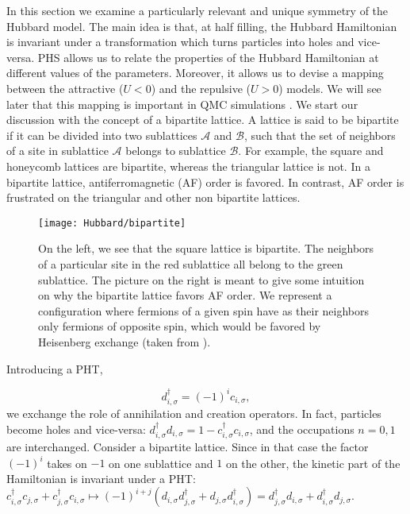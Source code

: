 In this section we examine a particularly relevant and unique symmetry of the Hubbard model.
The main idea is that, at half filling, the Hubbard Hamiltonian is invariant under a transformation which turns particles into holes and vice-versa.
\ac{PHS} allows us to relate the properties of the Hubbard Hamiltonian at different values of the parameters.
Moreover, it allows us to devise a mapping between the attractive ($U < 0$) and the repulsive ($U > 0$) models.
We will see later that this mapping is important in QMC simulations \cite{alavi_quantum_2016}.
We start our discussion with the concept of a bipartite lattice.
A lattice is said to be bipartite if it can be divided into two sublattices $\mathcal{A}$ and $\mathcal{B}$, such that the set of neighbors of a site in sublattice $\mathcal{A}$ belongs to sublattice $\mathcal{B}$.
For example, the square and honeycomb lattices are bipartite, whereas the triangular lattice is not.
In a bipartite lattice, antiferromagnetic (\acs{AF}) order is favored.
In contrast, \acs{AF} order is frustrated on the triangular and other non bipartite lattices.
\vspace{-0.2cm}
\begin{figure}[H]\label{fig:bipartite}
\centering
\texttt{[image: Hubbard/bipartite]}
\caption[Bipartite lattices and antiferromagnetic order.]{On the left, we see that the square lattice is bipartite.
The neighbors of a particular site in the red sublattice all belong to the green sublattice.
The picture on the right is meant to give some intuition on why the bipartite lattice favors \ac{AF} order.
We represent a configuration where fermions of a given spin have as their neighbors only fermions of opposite spin, which would be favored by Heisenberg exchange (taken from \cite{alavi_quantum_2016}). }
\end{figure}

Introducing a \ac{PHT},

\begin{equation}\label{eq:PHT}
d_{ i, \sigma}^\dagger = (-1)^i c_{i, \sigma} ,
\end{equation}
we exchange the role of annihilation and creation operators.
In fact, particles become holes and vice-versa: $d_{ i, \sigma}^\dagger d_{ i, \sigma} = 1 - c_{ i, \sigma}^\dagger c_{ i, \sigma} $, and the occupations $n = 0, 1$ are interchanged.
Consider a bipartite lattice.
Since in that case the factor $(-1)^i$ takes on $-1$ on one sublattice and $1$ on the other, the kinetic part of the Hamiltonian is invariant under a \ac{PHT}: $
c_{i, \sigma}^\dagger c_{j, \sigma} + c_{j, \sigma}^\dagger c_{i, \sigma} \mapsto (-1)^{i+j} ( d_{i, \sigma} d_{j, \sigma}^\dagger + d_{j, \sigma} d_{i, \sigma}^\dagger ) = d_{j, \sigma}^\dagger d_{i, \sigma} + d_{i, \sigma}^\dagger d_{j, \sigma}
$.


